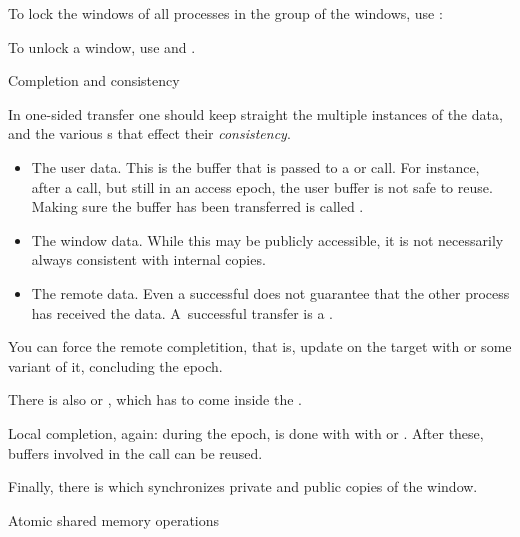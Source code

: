 To lock the windows of all processes in the group of the windows, use
:
%

To unlock a window, use  and
.


 {Completion and consistency}

In one-sided transfer one should keep straight the multiple instances
of the data, and the various s that effect
their \emph{consistency}.
\begin{itemize}
\item The user data. This is the buffer that is passed to a  or
   call. For instance, after a  call, but still in an
  access epoch, the user buffer is not safe to reuse. Making sure the
  buffer has been transferred is called .
\item The window data. While this may be publicly accessible, it is
  not necessarily always consistent with internal copies.
\item The remote data. Even a successful  does not guarantee
  that the other process has received the data. A~successful transfer
  is a .
\end{itemize}

You can force the remote completition, that is, update on the target
with
 or some variant of it, concluding the
epoch.

There is also
 or
, which has to come inside the
.
%

Local completion, again: during the epoch, is done with
with  or
.
After these, buffers involved in the call can be reused.
%

Finally, there is  which synchronizes
private and public copies of the window.

 {Atomic shared memory operations}

